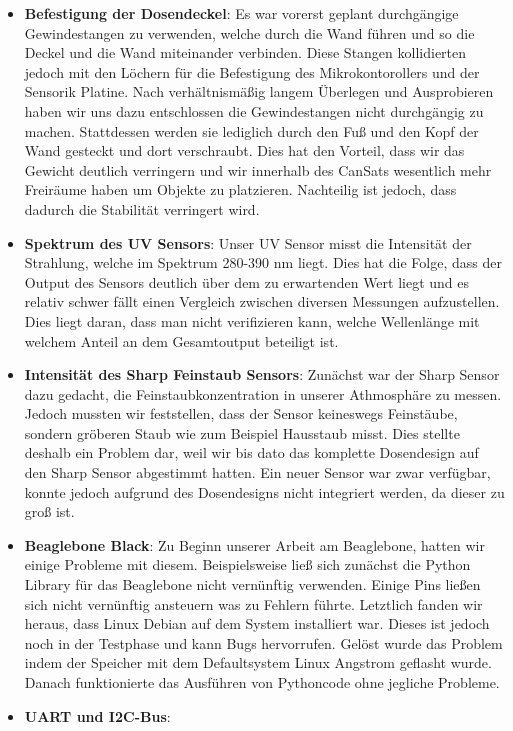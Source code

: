 \begin{itemize}
	\item \textbf{Befestigung der Dosendeckel}: Es war vorerst geplant durchgängige Gewindestangen zu verwenden, welche durch die Wand führen und so die Deckel und die Wand miteinander verbinden. Diese Stangen kollidierten jedoch mit den Löchern für die Befestigung des Mikrokontorollers und der Sensorik Platine. Nach verhältnismäßig langem Überlegen und Ausprobieren haben wir uns dazu entschlossen die Gewindestangen nicht durchgängig zu machen. Stattdessen werden sie lediglich durch den Fuß und den Kopf der Wand gesteckt und dort verschraubt. Dies hat den Vorteil, dass wir das Gewicht deutlich verringern und wir innerhalb des CanSats wesentlich mehr Freiräume haben um Objekte zu platzieren. Nachteilig ist jedoch, dass dadurch die Stabilität verringert wird.
	\item \textbf{Spektrum des UV Sensors}: Unser UV Sensor misst die Intensität der Strahlung, welche im Spektrum 280-390 nm liegt. Dies hat die Folge, dass der Output des Sensors deutlich über dem zu erwartenden Wert liegt und es relativ schwer fällt einen Vergleich zwischen diversen Messungen aufzustellen. Dies liegt daran, dass man nicht verifizieren kann, welche Wellenlänge mit welchem Anteil an dem Gesamtoutput beteiligt ist.
	\item \textbf{Intensität des Sharp Feinstaub Sensors}: Zunächst war der Sharp Sensor dazu gedacht, die Feinstaubkonzentration in unserer Athmosphäre zu messen. Jedoch mussten wir feststellen, dass der Sensor keineswegs Feinstäube, sondern gröberen Staub wie zum Beispiel Hausstaub misst. Dies stellte deshalb ein Problem dar, weil wir bis dato das komplette Dosendesign auf den Sharp Sensor abgestimmt hatten. Ein neuer Sensor war zwar verfügbar, konnte jedoch aufgrund des Dosendesigns nicht integriert werden, da dieser zu groß ist.
	\item \textbf{Beaglebone Black}: Zu Beginn unserer Arbeit am Beaglebone, hatten wir einige Probleme mit diesem. Beispielsweise ließ sich zunächst die Python Library für das Beaglebone nicht vernünftig verwenden. Einige Pins ließen sich nicht vernünftig ansteuern was zu Fehlern führte. Letztlich fanden wir heraus, dass Linux Debian auf dem System installiert war. Dieses ist jedoch noch in der Testphase und kann Bugs hervorrufen. Gelöst wurde das Problem indem der Speicher mit dem Defaultsystem Linux Angstrom geflasht wurde. Danach funktionierte das Ausführen von Pythoncode ohne jegliche Probleme.
	\item \textbf{UART und I2C-Bus}:

\end{itemize}
